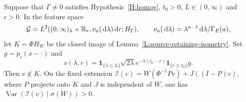 \setcounter{nogo}{31}
\begin{nogo}
  \label{P:nogo-32}
  Suppose that $\Gamma\ne0$ satisfies Hypothesis~\ref{H:homog}, $t_0>0$,
  $L\in(0,\infty)$ and $\epsilon>0$. In the feature space
  \[
    \mathcal G=L^2((0,\infty)_\lambda\times\mathbb{R}_r,
    \nu_a(\,\mathrm{d}\lambda)\,\mathrm{d} r;H_\Gamma),\qquad
    \nu_a(\,\mathrm{d}\lambda)=\lambda^{a-1}\,\mathrm{d}\lambda/\Gamma_E(a),
  \]
  let $K=\Phi H_W$ be the closed image of
  Lemma~\ref{L:source-retaining-isometry}. Set $g=p_\epsilon(x-\cdot)$ and
  \[
    v(\lambda,r)=\mathbf1_{\{\lambda\le L\}}\sqrt{2\lambda}
    e^{-\lambda(t_0-r)}\mathbf1_{\{r\le t_0\}}g.
  \]
  Then $v\notin K$. On the fixed extension
  $\mathcal I(v)=W(\Phi^{-1}Pv)+J((I-P)v)$, where $P$ projects onto $K$
  and $J$ is independent of $W$, one has
  $\operatorname{Var}(\mathcal I(v)\mid\sigma(W))>0$.
\end{nogo}
